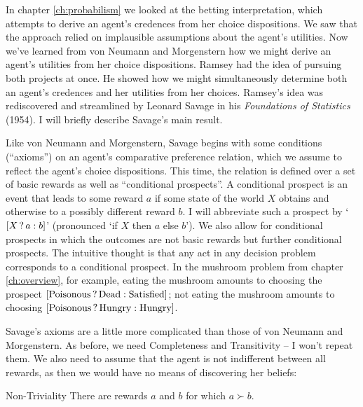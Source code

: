 In chapter \ref{ch:probabilism} we looked at the betting
interpretation, which attempts to derive an agent's credences from her
choice dispositions. We saw that the approach relied on implausible
assumptions about the agent's utilities. Now we've learned from von
Neumann and Morgenstern how we might derive an agent's utilities from
her choice dispositions. Ramsey had the idea of pursuing both projects
at once. He showed how we might simultaneously determine both an
agent's credences and her utilities from her choices.%
%
%
Ramsey's idea was rediscovered and streamlined by Leonard Savage in
his \emph{Foundations of Statistics} (1954). I will briefly describe
Savage's main result.

Like von Neumann and Morgenstern, Savage begins with some conditions
(``axioms'') on an agent's comparative preference relation, which we
assume to reflect the agent's choice dispositions. This time, the
relation is defined over a set of basic rewards as well as
``conditional prospects''. A conditional prospect is an event that
leads to some reward $a$ if some state of the world $X$ obtains and
otherwise to a possibly different reward $b$. I will abbreviate such a
prospect by `$[X\,?\, a :b]$' (pronounced `if $X$ then $a$ else $b$').
We also allow for conditional prospects in which the outcomes are not
basic rewards but further conditional prospects. The intuitive thought
is that any act in any decision problem corresponds to a conditional
prospect. In the mushroom problem from chapter \ref{ch:overview}, for
example, eating the mushroom amounts to choosing the prospect
$[\text{Poisonous}\,?\, \text{Dead} :\text{Satisfied}]$; not eating
the mushroom amounts to choosing
$[\text{Poisonous}\,?\, \text{Hungry} :\text{Hungry}]$.

Savage's axioms are a little more complicated than those of von
Neumann and Morgenstern. As before, we need Completeness and
Transitivity -- I won't repeat them. We also need to assume that the
agent is not indifferent between all rewards, as then we would have no
means of discovering her beliefs:
%
\begin{genericthm}{Non-Triviality}
  There are rewards $a$ and $b$ for which $a\succ b$.
\end{genericthm}

